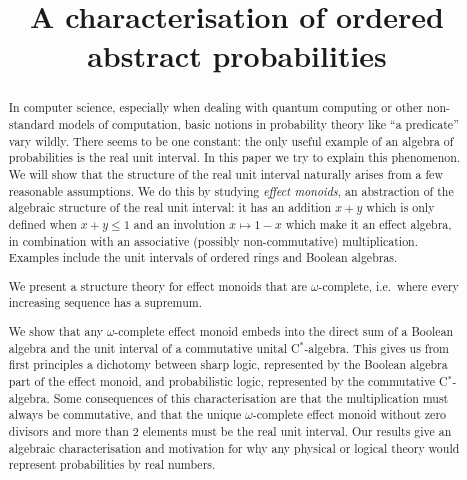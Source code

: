 \documentclass[10pt,conference]{IEEEtran}
\theoremstyle{definition}
\begin{document}
\StopCensoring
\title{A characterisation of ordered abstract probabilities}

\author{
\and{}
\and{}
}

\maketitle

\begin{abstract}
In computer science,
    especially when dealing with quantum computing
        or other non-standard models of computation,
    basic notions in probability theory
    like ``a predicate'' vary wildly.
There seems to be one constant:
    the only useful example of an algebra of probabilities is
    the real unit interval.
In this paper we try to explain this phenomenon.
We will show that the structure of the real unit interval naturally
arises from a few reasonable assumptions.
We do this by studying \emph{effect monoids}, an abstraction of the algebraic structure of the real unit interval:
it has an addition $x+y$ which is only defined when $x+y\leq 1$ and an involution $x\mapsto 1-x$ which make it an effect algebra, in combination with an associative (possibly non-commutative) multiplication.
Examples include the unit intervals of ordered rings and Boolean algebras.

We present a structure theory for effect monoids that are
$\omega$-complete, i.e.\ where every increasing sequence has a supremum.

We show that any $\omega$-complete effect monoid 
embeds into the direct sum of a Boolean algebra and
the unit interval of a commutative unital
    C$^*$-algebra.
This gives us from first principles a dichotomy between sharp logic, represented by the Boolean algebra part of the effect monoid, and probabilistic logic, represented by the commutative C$^*$-algebra.
Some consequences of this characterisation are that the multiplication must always be commutative, and that the unique $\omega$-complete effect monoid without zero divisors and more than 2 elements must be the real unit interval.
Our results give an algebraic characterisation and motivation for why any physical or logical theory would represent probabilities by real numbers.
\end{abstract}
\end{document}
